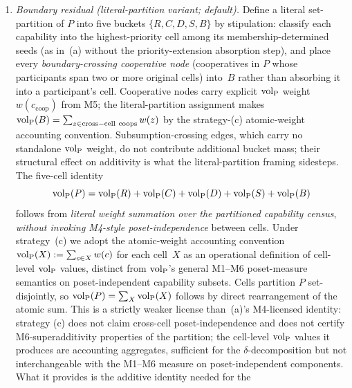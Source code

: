 \begin{remark}
\begin{enumerate}
  $P$, then assigns each component to a cell by its
  highest-priority member (as in strategy~(a)).  Sub-partitioning
  within an original cell alone does not eliminate edges
  crossing other original cells; the global-component view is
  what licenses M4.  In practice strategy~(b) coincides with
  strategy~(a) on the global-component partition; the
  difference is presentational (sub-partitioning makes the
  component structure explicit before priority assignment).
\item[(c)] \emph{Boundary residual (literal-partition
  variant; default).}  Define a literal
  set-partition of $P$ into five buckets $\{R, C, D, S, B\}$
  by stipulation: classify each capability into the
  highest-priority cell among its membership-determined seeds
  (as in~(a) without the priority-extension absorption step),
  and place every \emph{boundary-crossing cooperative node}
  (cooperatives in $P$ whose participants span two or more
  original cells) into~$B$ rather than absorbing it into a
  participant's cell.  Cooperative nodes carry explicit
  ${\operatorname{vol}_{\mathrm{P}}}$ weight $w(c_{\mathrm{coop}})$ from M5; the
  literal-partition assignment makes
  ${\operatorname{vol}_{\mathrm{P}}}(B) = \sum_{z \in \mathrm{cross-cell\ coops}} w(z)$
  by the strategy-(c) atomic-weight accounting convention.  Subsumption-crossing
  edges, which carry no standalone ${\operatorname{vol}_{\mathrm{P}}}$ weight, do not
  contribute additional bucket mass; their structural effect
  on additivity is what the literal-partition framing
  sidesteps.  The five-cell identity
  \[
    {\operatorname{vol}_{\mathrm{P}}}(P) = {\operatorname{vol}_{\mathrm{P}}}(R) + {\operatorname{vol}_{\mathrm{P}}}(C) + {\operatorname{vol}_{\mathrm{P}}}(D) + {\operatorname{vol}_{\mathrm{P}}}(S) +
    {\operatorname{vol}_{\mathrm{P}}}(B)
  \]
  follows from \emph{literal weight summation over the
  partitioned capability census}, \emph{without invoking
  M4-style poset-independence} between cells.  Under
  strategy~(c) we adopt the atomic-weight accounting convention
  ${\operatorname{vol}_{\mathrm{P}}}(X) := \sum_{c \in X} w(c)$ for each cell~$X$ as an
  operational definition of cell-level ${\operatorname{vol}_{\mathrm{P}}}$ values, distinct
  from ${\operatorname{vol}_{\mathrm{P}}}$'s general M1--M6 poset-measure semantics on
  poset-independent capability subsets.  Cells partition $P$
  set-disjointly, so ${\operatorname{vol}_{\mathrm{P}}}(P) = \sum_X {\operatorname{vol}_{\mathrm{P}}}(X)$ follows by
  direct rearrangement of the atomic sum.  This is a strictly
  weaker license than~(a)'s M4-licensed identity: strategy
  (c) does not claim cross-cell poset-independence and does
  not certify M6-superadditivity properties of the partition;
  the cell-level ${\operatorname{vol}_{\mathrm{P}}}$ values it produces are accounting
  aggregates, sufficient for the $\delta$-decomposition but
  not interchangeable with the M1--M6 measure on
  poset-independent components.
  What it provides is the additive identity needed for the

\end{enumerate}
\end{remark}
